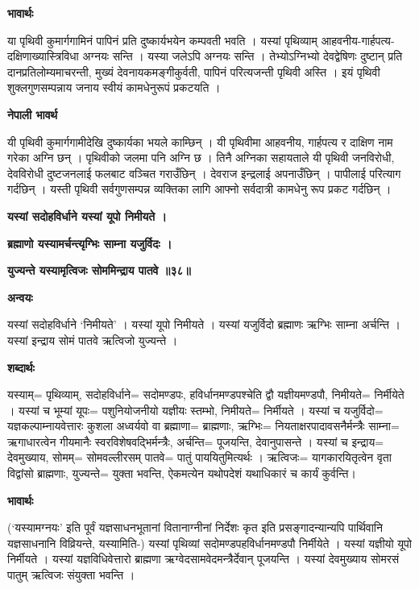 \documentclass[11pt, a5paper]{article}
\begin{document}
\textbf{भावार्थः}

या पृथिवी कुमार्गगामिनं पापिनं प्रति दुष्कार्यभयेन कम्पवती भवति । यस्यां पृथिव्याम् आहवनीय-गार्हपत्य-दक्षिणाख्यास्त्रिविधा अग्नयः सन्ति । यस्या जलेऽपि अग्नयः सन्ति । तेभ्योऽग्निभ्यो देवद्वेषिणः दुष्टान् प्रति दानप्रतिलोम्यमाचरन्ती, मुख्यं देवनायकमङ्गीकुर्वती, पापिनं परित्यजन्ती पृथिवी अस्ति । इयं पृथिवी शुक्लगुणसम्पन्नाय जनाय स्वीयं कामधेनुरूपं प्रकटयति ।

\textbf{नेपाली भावर्थ}

यी पृथिवी कुमार्गगामीदेखि दुष्कार्यका भयले काम्छिन् । यी पृथिवीमा आहवनीय, गार्हपत्य र दाक्षिण नाम गरेका अग्नि छन् । पृथिवीको जलमा पनि अग्नि छ । तिनै अग्निका सहायताले यी पृथिवी जनविरोधी, देवविरोधी दुष्टजनलाई फलबाट वञ्चित गराउँछिन् । देवराज इन्द्रलाई अपनाउँछिन् । पापीलाई परित्याग गर्दछिन् । यस्ती पृथिवी सर्वगुणसम्पन्न व्यक्तिका लागि आफ्नो सर्वदात्री कामधेनु रूप प्रकट गर्दछिन् ।

\textbf{यस्यां सदोहविर्धाने यस्यां यूपो निमीयते ।}

\textbf{ब्रह्माणो यस्यामर्चन्त्यृग्भिः साम्ना यजुर्विदः ।}

\textbf{युज्यन्ते यस्यामृत्विजः सोममिन्द्राय पातवे ॥३८॥}

\textbf{अन्वयः}

यस्यां सदोहविर्धाने ‘निमीयते’ । यस्यां यूपो निमीयते । यस्यां यजुर्विदो ब्रह्माणः ऋग्भिः साम्ना अर्चन्ति । यस्यां इन्द्राय सोमं पातवे ऋत्विजो युज्यन्ते ।

\textbf{शब्दार्थः}

यस्याम्= पृथिव्याम्, सदोहविर्धाने= सदोमण्डपः, हविर्धानमण्डपश्चेति द्वौ यज्ञीयमण्डपौ, निमीयते= निर्मीयेते । यस्यां च भूम्यां यूपः= पशुनियोजनीयो यज्ञीयः स्तम्भो, निमीयते= निर्मीयते । यस्यां च यजुर्विदो= यज्ञकल्पाम्नायवेत्तारः कुशला अध्वर्यवो वा ब्रह्माणा= ब्राह्मणाः, ऋग्भिः= नियताक्षरपादावसनैर्मन्त्रैः साम्ना= ऋगाधारत्वेन गीयमानैः स्वरविशेषवद्भिर्मन्त्रैः, अर्चन्ति= पूजयन्ति, देवानुपासन्ते । यस्यां च इन्द्राय= देवमुख्याय, सोमम्= सोमवल्लीरसम् पातवे= पातुं पाययितुमित्यर्थः । ऋत्विजः= यागकारयितृत्वेन वृता विद्वांसो ब्राह्मणाः, युज्यन्ते= युक्ता भवन्ति, ऐकमत्येन यथोपदेशं यथाधिकारं च कार्यं कुर्वन्ति।

\textbf{भावार्थः}

(‘यस्यामग्नयः’ इति पूर्वं यज्ञसाधनभूतानां वितानाग्नीनां निर्देशः कृत इति प्रसङ्गादन्यान्यपि पार्थिवानि यज्ञसाधनानि विव्रियन्ते, यस्यामिति-) यस्यां पृथिव्यां सदोमण्डपहविर्धानमण्डपौ निर्मीयेते । यस्यां यज्ञीयो यूपो निर्मीयते । यस्यां यज्ञविधिवेत्तारो ब्राह्मणा ऋग्वेदसामवेदमन्त्रैर्देवान् पूजयन्ति । यस्यां देवमुख्याय सोमरसं पातुम् ऋत्विजः संयुक्ता भवन्ति ।
\end{document}
